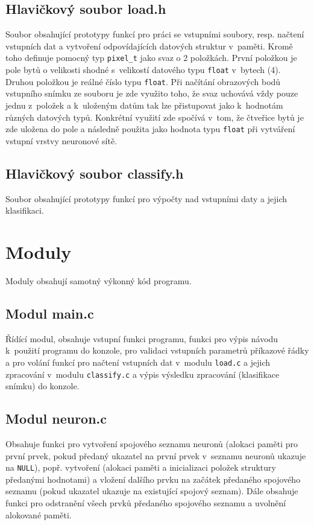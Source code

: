 \documentclass[12pt, a4paper, titlepage]{report}
\begin{document}
\subsection{Hlavičkový soubor load.h}
Soubor obsahující prototypy funkcí pro práci se vstupními soubory, resp. načtení vstupních dat a vytvoření odpovídajících datových struktur v~paměti. Kromě toho definuje pomocný typ \texttt{pixel\_t} jako svaz o 2 položkách. První položkou je pole bytů o velikosti shodné s~velikostí datového typu \texttt{float} v~bytech (4). Druhou položkou je reálné číslo typu \texttt{float}. Při načítání obrazových bodů vstupního snímku ze souboru je zde využito toho, že svaz uchovává vždy pouze jednu z~položek a k~uloženým datům tak lze přistupovat jako k~hodnotám různých datových typů. Konkrétní využití zde spočívá v~tom, že čtveřice bytů je zde uložena do pole a následně použita jako hodnota typu \texttt{float} při vytváření vstupní vrstvy neuronové sítě.
\subsection{Hlavičkový soubor classify.h}
Soubor obsahující prototypy funkcí pro výpočty nad vstupními daty a jejich klasifikaci.
\section{Moduly}
Moduly obsahují samotný výkonný kód programu.
\subsection{Modul main.c}
Řídící modul, obsahuje vstupní funkci programu, funkci pro výpis návodu k~použití programu do konzole, pro validaci vstupních parametrů příkazové řádky a pro volání funkcí pro načtení vstupních dat v~modulu \texttt{load.c} a jejich zpracování v~modulu \texttt{classify.c} a výpis výsledku zpracování (klasifikace snímku) do konzole.
\subsection{Modul neuron.c}
Obsahuje funkci pro vytvoření spojového seznamu neuronů (alokaci paměti pro první prvek, pokud předaný ukazatel na první prvek v~seznamu neuronů ukazuje na \texttt{NULL}), popř. vytvoření (alokaci paměti a inicializaci položek struktury předanými hodnotami) a vložení dalšího prvku na začátek předaného spojového seznamu (pokud ukazatel ukazuje na existující spojový seznam). Dále obsahuje funkci pro odstranění všech prvků předaného spojového seznamu a uvolnění alokované paměti.
\end{document}
